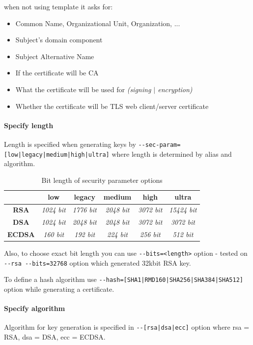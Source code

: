 \documentclass[10pt, a4paper]{report}
\begin{document}
{when not using template it asks for:
\begin{itemize}
\item Common Name, Organizational Unit, Organization, ...
\item Subject's domain component
\item Subject Alternative Name
\item If the certificate will be CA
\item What the certificate will be used for \textit{(signing $\vert$ encryption)}
\item Whether the certificate will be TLS web client/server certificate
\end{itemize}

\pagebreak

      \paragraph{Specify length}

Length is specified when generating keys by \verb+--sec-param=[low|legacy|medium|high|ultra]+ where length is determined by alias and algorithm.

\begin{table}[]
\centering
\caption{Bit length of security parameter options}
\label{my-label}
\begin{tabular}{|c|c|c|c|c|c|}
\hline
               & \textbf{low}      & \textbf{legacy}   & \textbf{medium}   & \textbf{high}     & \textbf{ultra}     \\ \hline
\textbf{RSA}   & \textit{1024 bit} & \textit{1776 bit} & \textit{2048 bit} & \textit{3072 bit} & \textit{15424 bit} \\ \hline
\textbf{DSA}   & \textit{1024 bit} & \textit{2048 bit} & \textit{2048 bit} & \textit{3072 bit} & \textit{3072 bit}  \\ \hline
\textbf{ECDSA} & \textit{160 bit}  & \textit{192 bit}  & \textit{224 bit}  & \textit{256 bit}  & \textit{512 bit}   \\ \hline
\end{tabular}
\end{table}

Also, to choose exact bit length you can use \verb+--bits=<length>+ option - tested on \verb+--rsa --bits=32768+ option which generated 32kbit RSA key.

To define a hash algorithm use \verb+--hash=[SHA1|RMD160|SHA256|SHA384|SHA512]+ option while generating a certificate.

      \paragraph{Specify algorithm}
Algorithm for key generation is specified in \verb+--[rsa|dsa|ecc]+ option where rsa = RSA, dsa = DSA, ecc = ECDSA.
    
}
\end{document}

